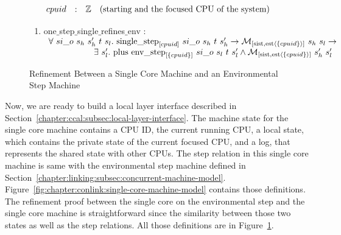 \begin{figure}
\noindent{}
$$
\begin{array}{lllr}
cpuid & : & \ztype &  \mbox{(starting and the focused CPU of the system)}\\
\end{array}
$$

\noindent{}
\begin{mathpar}
\end{mathpar}

\noindent{}
\begin{enumerate}
\item one$\_$step$\_$single$\_$refines$\_$env : \\
$
\begin{array}{l}
\forall \ si\_o \ s_h \ s_h' \ t \ s_l . \ \singlestep{cpuid}{si\_o}{s_h}{t}{s_h'} \rightarrow  \matchsinglestatestate{\set{cpuid}}{s_h}{s_l} \rightarrow \\
\ \ \ \ \ \ \ \ \ \ \ \ \ \ \ \ \exists\ s_l' . \  \ccplusstep{\envstep{\set{cpuid}}{si\_o}{s_l}{t}{s_l'}} \wedge  \matchsinglestatestate{\set{cpuid}}{s_h'}{s_l'}\\
\end{array}
$
\end{enumerate}
\caption{Refinement Between a Single Core Machine and an Environmental Step Machine}
\label{fig:chapter:conlink:cpu-single-to-env-theorem}
\end{figure}


Now, we are ready to build a local layer interface described in Section~\ref{chapter:ccal:subsec:local-layer-interface}. 
The machine state for the single core machine contains 
a CPU ID, the current running CPU, 
a local state, which contains the private state of the current focused CPU,
and a log, that represents the shared state with other CPUs. 
The step relation in this single core machine is same with the environmental step machine defined in Section~\ref{chapter:linking:subsec:concurrent-machine-model}. Figure~\ref{fig:chapter:conlink:single-core-machine-model} contains those definitions. 
The refinement proof between the single core on the environmental step and the single core machine is straightforward since the similarity between
those two states  as well as the step relations.
All those definitions are in Figure~\ref{fig:chapter:conlink:cpu-single-to-env-theorem}.

